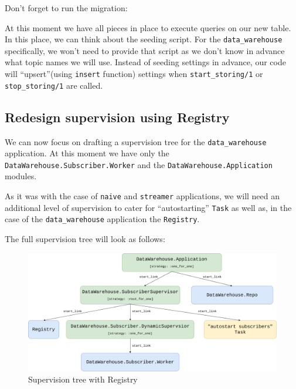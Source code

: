 \documentclass[
]{book}
\newenvironment{Shaded}{\begin{snugshade}}{\end{snugshade}}
\newcommand{\ExtensionTok}[1]{#1}
\newcommand{\NormalTok}[1]{#1}
\begin{document}
Don't forget to run the migration:

\begin{Shaded}
\end{Shaded}

At this moment we have all pieces in place to execute queries on our new table. In this place, we can think about the seeding script. For the \texttt{data\_warehouse} specifically, we won't need to provide that script as we don't know in advance what topic names we will use. Instead of seeding settings in advance, our code will ``upsert''(using \texttt{insert} function) settings when \texttt{start\_storing/1} or \texttt{stop\_storing/1} are called.

\hypertarget{redesign-supervision-using-registry}{%
\subsection{Redesign supervision using Registry}\label{redesign-supervision-using-registry}}

We can now focus on drafting a supervision tree for the \texttt{data\_warehouse} application. At this moment we have only the \texttt{DataWarehouse.Subscriber.Worker} and the \texttt{DataWarehouse.Application} modules.

As it was with the case of \texttt{naive} and \texttt{streamer} applications, we will need an additional level of supervision to cater for ``autostarting'' \texttt{Task} as well as, in the case of the \texttt{data\_warehouse} application the \texttt{Registry}.

The full supervision tree will look as follows:

\begin{figure}
\centering
\includegraphics{images/chapter_14_01_sup_diagram.png}
\caption{Supervision tree with Registry}
\end{figure}
\end{document}
